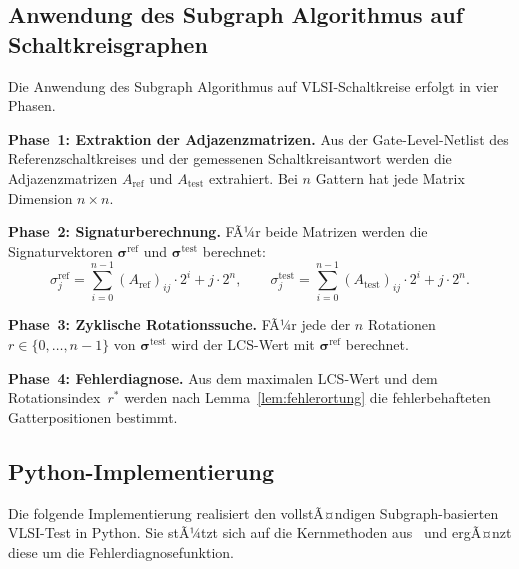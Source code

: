 ﻿\documentclass[a4paper,12pt]{article}
\theoremstyle{definition}
\begin{document}
\subsection{Anwendung des Subgraph Algorithmus auf Schaltkreisgraphen}

Die Anwendung des Subgraph Algorithmus auf VLSI-Schaltkreise erfolgt
in vier Phasen.

\textbf{Phase~1: Extraktion der Adjazenzmatrizen.}
Aus der Gate-Level-Netlist des Referenzschaltkreises und der gemessenen
Schaltkreisantwort werden die Adjazenzmatrizen $A_{\mathrm{ref}}$ und
$A_{\mathrm{test}}$ extrahiert. Bei $n$ Gattern hat jede Matrix Dimension
$n \times n$.

\textbf{Phase~2: Signaturberechnung.}
FÃ¼r beide Matrizen werden die Signaturvektoren
$\boldsymbol{\sigma}^{\mathrm{ref}}$ und
$\boldsymbol{\sigma}^{\mathrm{test}}$ berechnet:
\[
  \sigma_j^{\mathrm{ref}}
  = \sum_{i=0}^{n-1} (A_{\mathrm{ref}})_{ij} \cdot 2^i + j \cdot 2^n,
  \qquad
  \sigma_j^{\mathrm{test}}
  = \sum_{i=0}^{n-1} (A_{\mathrm{test}})_{ij} \cdot 2^i + j \cdot 2^n.
\]

\textbf{Phase~3: Zyklische Rotationssuche.}
FÃ¼r jede der $n$ Rotationen $r \in \{0, \ldots, n-1\}$ von
$\boldsymbol{\sigma}^{\mathrm{test}}$ wird der LCS-Wert mit
$\boldsymbol{\sigma}^{\mathrm{ref}}$ berechnet.

\textbf{Phase~4: Fehlerdiagnose.}
Aus dem maximalen LCS-Wert und dem Rotationsindex~$r^*$ werden nach
Lemma~\ref{lem:fehlerortung} die fehler\-behafteten Gatter\-positionen
bestimmt.

\subsection{Python-Implementierung}

Die folgende Implementierung realisiert den vollstÃ¤ndigen
Subgraph-basierten VLSI-Test in Python. Sie stÃ¼tzt sich auf die
Kernmethoden aus~\cite{epp2026subgraph} und ergÃ¤nzt diese um die
Fehlerdiagnosefunktion.
\end{document}
